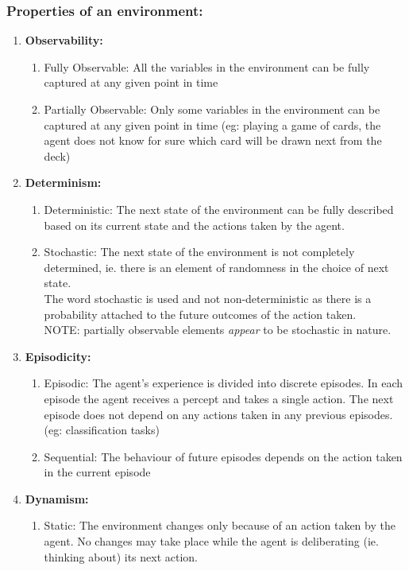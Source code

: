 \documentclass{article}
\theoremstyle{plain}
\theoremstyle{definition}
\begin{document}
    \subsubsection{Properties of an environment:}
    
    \begin{enumerate}
        \item \textbf{Observability:}
        \begin{enumerate}
            \item Fully Observable: All the variables in the environment can be fully captured at any given point in time
            
            \item Partially Observable: Only some variables in the environment can be captured at any given point in time (eg: playing a game of cards, the agent does not know for sure which card will be drawn next from the deck)
        \end{enumerate}
        \item \textbf{Determinism:}
        \begin{enumerate}
            \item Deterministic: The next state of the environment can be fully described based on its current state and the actions taken by the agent.
            
            \item Stochastic: The next state of the environment is not completely determined, ie. there is an element of randomness in the choice of next state.\\
            The word stochastic is used and not non-deterministic as there is a probability attached to the future outcomes of the action taken.\\
            NOTE: partially observable elements \textit{appear} to be stochastic in nature.
        \end{enumerate}
        \item \textbf{Episodicity:}
        \begin{enumerate}
            \item Episodic: The agent's experience is divided into discrete episodes. In each episode the agent receives a percept and takes a single action. The next episode does not depend on any actions taken in any previous episodes. (eg: classification tasks)
            
            \item Sequential: The behaviour of future episodes depends on the action taken in the current episode
        \end{enumerate}
        \item \textbf{Dynamism:}
        \begin{enumerate}
            \item Static: The environment changes only because of an action taken by the agent. No changes may take place while the agent is deliberating (ie. thinking about) its next action.
            

\end{enumerate}
\end{enumerate}
\end{document}
